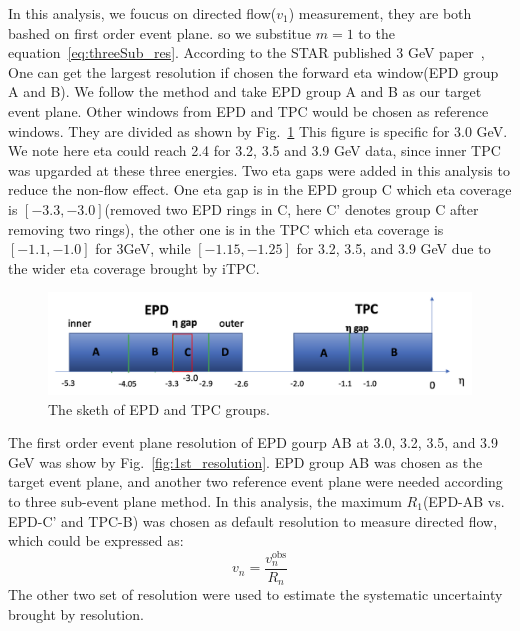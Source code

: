 In this analysis, we foucus on directed flow($v_1$) measurement, they are both bashed on 
first order event plane. so we substitue $m=1$ to the equation~\ref{eq:threeSub_res}. According to the STAR published 3 GeV paper~\cite{Abdallah_2022},
One can get the largest resolution if chosen the forward eta window(EPD group A and B). We follow the method and take EPD group A and B 
as our target event plane. Other windows from EPD and TPC would be chosen as reference windows. They are divided as shown by Fig.~\ref{fig:EPD_TPC_groups}
This figure is specific for 3.0 GeV. We note here eta could reach 2.4 for 3.2, 3.5 and 3.9 GeV data, since inner TPC was upgarded at these three energies.
Two eta gaps were added in this analysis to reduce the non-flow effect. One eta gap is in the EPD group C which eta coverage is $[-3.3, -3.0]$(removed two EPD rings in C, here C' denotes group C after removing two rings), 
the other one is in the TPC which eta coverage is $[-1.1, -1.0]$ for 3GeV, while $[-1.15, -1.25]$ for 3.2, 3.5, and 3.9 GeV due to the wider eta coverage brought by iTPC. 
\begin{figure}[hbt!]
\centering
\includegraphics[width=0.65\linewidth]{figures/chapter02/EPD_TPC_groups.png}
\caption{The sketh of EPD and TPC groups.}
\label{fig:EPD_TPC_groups}
\end{figure}



The first order event plane resolution of EPD gourp AB at 3.0, 3.2, 3.5, and 3.9 GeV was show by Fig.~\ref{fig:1st_resolution}.
EPD group AB was chosen as the target event plane, and another two reference event plane were needed according to three sub-event plane method.
In this analysis, the maximum $R_1$(EPD-AB vs. EPD-C' and TPC-B) was chosen as default resolution to measure directed flow, which could be expressed as:
\begin{equation}
v_n=\frac{v_n^{\mathrm{obs}}}{R_n}
\label{eq:vn}
\end{equation}
The other two set of resolution were used to estimate the systematic uncertainty brought by resolution.

